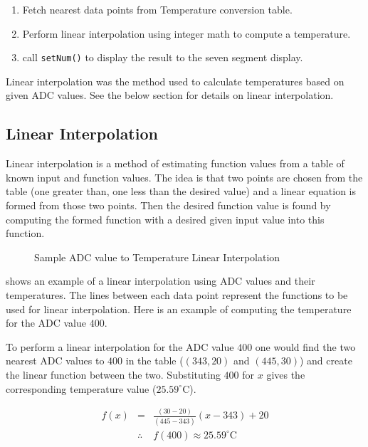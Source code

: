 \documentclass[main.tex]{subfiles}
\begin{document}
		\begin{enumerate}
			\item Fetch nearest data points from Temperature conversion table.
			\item Perform linear interpolation using integer math to compute a
				temperature.
			\item call \lstinline{setNum()} to display the result to the seven segment
				display.
		\end{enumerate}	

		Linear interpolation was the method used to calculate temperatures based on
		given ADC values. See the below section for details on linear interpolation.

		\subsection{Linear Interpolation}
		Linear interpolation is a method of estimating function values from a table
		of known input and function values. The idea is that two points are chosen
		from the table (one greater than, one less than the desired value) and a
		linear equation is formed from those two points. Then the desired function
		value is found by computing the formed function with a desired given input
		value into this function.

		\begin{figure}[H]
			\begin{center}
				
			\end{center}
			\caption{Sample ADC value to Temperature Linear Interpolation}
			\label{fig:adcTempGraph}
		\end{figure}

		 shows an example of a linear interpolation using ADC
		values and their temperatures. The lines between each data point represent
		the functions to be used for linear interpolation. Here is an example of
		computing the temperature for the ADC value $400$.
		
		To perform a linear interpolation for the ADC value $400$ one
		would find the two nearest ADC values to $400$ in the table ($(343,20)$ and
		$(445,30)$) and create the linear function between the two. Substituting $400$ for $x$
		gives the corresponding temperature value ($25.59^{\circ}\mathrm{C}$).

		\begin{eqnarray*}
			f(x) & = & \frac{(30-20)}{(445-343)}(x-343)+20 \\
			& \therefore & f(400) \approx 25.59^{\circ}\mathrm{C}
		\end{eqnarray*}
\end{document}
